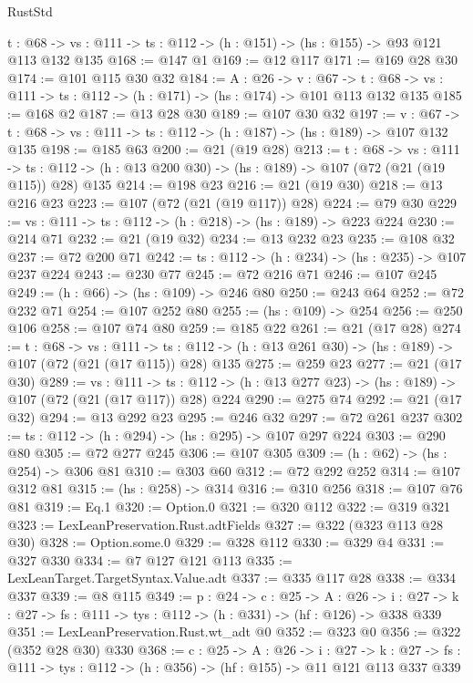 \begin{lexlean}{RustStd}
\begin{coremodule}
  {t : @68} -> {vs : @111} -> {ts : @112} -> (h : @151) -> (hs : @155) -> @93 @121 @113 @132 @135
@168 := @147 @1
@169 := @12 @117
@171 := @169 @28 @30
@174 := @101 @115 @30 @32
@184 := {A : @26} ->
  {v : @67} ->
  {t : @68} -> {vs : @111} -> {ts : @112} -> (h : @171) -> (hs : @174) -> @101 @113 @132 @135
@185 := @168 @2
@187 := @13 @28 @30
@189 := @107 @30 @32
@197 := {v : @67} ->
  {t : @68} -> {vs : @111} -> {ts : @112} -> (h : @187) -> (hs : @189) -> @107 @132 @135
@198 := @185 @63
@200 := @21 (@19 @28)
@213 := {t : @68} ->
  {vs : @111} ->
  {ts : @112} -> (h : @13 @200 @30) -> (hs : @189) -> @107 (@72 (@21 (@19 @115)) @28) @135
@214 := @198 @23
@216 := @21 (@19 @30)
@218 := @13 @216 @23
@223 := @107 (@72 (@21 (@19 @117)) @28)
@224 := @79 @30
@229 := {vs : @111} -> {ts : @112} -> (h : @218) -> (hs : @189) -> @223 @224
@230 := @214 @71
@232 := @21 (@19 @32)
@234 := @13 @232 @23
@235 := @108 @32
@237 := @72 @200 @71
@242 := {ts : @112} -> (h : @234) -> (hs : @235) -> @107 @237 @224
@243 := @230 @77
@245 := @72 @216 @71
@246 := @107 @245
@249 := (h : @66) -> (hs : @109) -> @246 @80
@250 := @243 @64
@252 := @72 @232 @71
@254 := @107 @252 @80
@255 := (hs : @109) -> @254
@256 := @250 @106
@258 := @107 @74 @80
@259 := @185 @22
@261 := @21 (@17 @28)
@274 := {t : @68} ->
  {vs : @111} ->
  {ts : @112} -> (h : @13 @261 @30) -> (hs : @189) -> @107 (@72 (@21 (@17 @115)) @28) @135
@275 := @259 @23
@277 := @21 (@17 @30)
@289 := {vs : @111} ->
  {ts : @112} -> (h : @13 @277 @23) -> (hs : @189) -> @107 (@72 (@21 (@17 @117)) @28) @224
@290 := @275 @74
@292 := @21 (@17 @32)
@294 := @13 @292 @23
@295 := @246 @32
@297 := @72 @261 @237
@302 := {ts : @112} -> (h : @294) -> (hs : @295) -> @107 @297 @224
@303 := @290 @80
@305 := @72 @277 @245
@306 := @107 @305
@309 := (h : @62) -> (hs : @254) -> @306 @81
@310 := @303 @60
@312 := @72 @292 @252
@314 := @107 @312 @81
@315 := (hs : @258) -> @314
@316 := @310 @256
@318 := @107 @76 @81
@319 := Eq.{1}
@320 := Option.{0}
@321 := @320 @112
@322 := @319 @321
@323 := LexLeanPreservation.Rust.adtFields
@327 := @322 (@323 @113 @28 @30)
@328 := Option.some.{0}
@329 := @328 @112
@330 := @329 @4
@331 := @327 @330
@334 := @7 @127 @121 @113
@335 := LexLeanTarget.TargetSyntax.Value.adt
@337 := @335 @117 @28
@338 := @334 @337
@339 := @8 @115
@349 := {p : @24} ->
  {c : @25} ->
  {A : @26} ->
  {i : @27} -> {k : @27} -> {fs : @111} -> {tys : @112} -> (h : @331) -> (hf : @126) -> @338 @339
@351 := LexLeanPreservation.Rust.wt_adt @0
@352 := @323 @0
@356 := @322 (@352 @28 @30) @330
@368 := {c : @25} ->
  {A : @26} ->
  {i : @27} ->
  {k : @27} -> {fs : @111} -> {tys : @112} -> (h : @356) -> (hf : @155) -> @11 @121 @113 @337 @339

\end{coremodule}
\end{lexlean}
